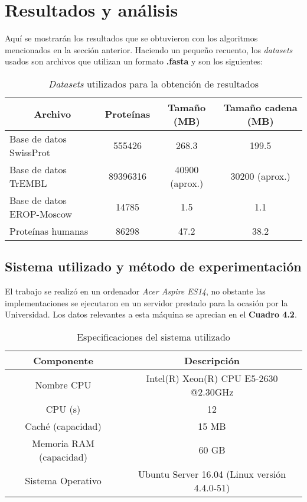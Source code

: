 \chapter{Resultados y análisis}

Aquí se mostrarán los resultados que se obtuvieron con los algoritmos mencionados en la sección anterior. Haciendo un pequeño recuento, los \textit{datasets} usados son archivos que utilizan un formato \textbf{.fasta} y son los siguientes:

\begin{table}[h]
\centering
\label{my-labelr1}
\begin{tabular}{|l|c|c|c|}
\hline
\multicolumn{1}{|c|}{\textbf{Archivo}} & \textbf{Proteínas} & \textbf{Tamaño (MB)} & \textbf{Tamaño cadena (MB)} \\ \hline
Base de datos SwissProt    & 555426                & 268.3                & 199.5              \\
Base de datos TrEMBL        & 89396316              & 40900 (aprox.)       & 30200 (aprox.)     \\
Base de datos EROP-Moscow        & 14785                 & 1.5                  & 1.1                \\
Proteínas humanas     & 86298                 & 47.2                 & 38.2               \\ \hline
\end{tabular}
\caption{\textit{Datasets} utilizados para la obtención de resultados}
\end{table} 

\section{Sistema utilizado y método de experimentación}

El trabajo se realizó en un ordenador \textit{Acer Aspire ES14}, no obstante las implementaciones se ejecutaron en un servidor prestado para la ocasión por la Universidad. Los datos relevantes a esta máquina se aprecian en el \textbf{Cuadro 4.2}.

\begin{table}[h]
\centering
\label{my-labelr2}
\begin{tabular}{|c|c|}
\hline
\textbf{Componente}     & \textbf{Descripción}                         \\ \hline
Nombre CPU              & Intel(R) Xeon(R) CPU E5-2630 @2.30GHz        \\
CPU (s)                 & 12                                           \\
Caché (capacidad)       & 15 MB                                        \\
Memoria RAM (capacidad) & 60 GB                                        \\
Sistema Operativo       & Ubuntu Server 16.04 (Linux versión 4.4.0-51) \\ \hline
\end{tabular}
\caption{Especificaciones del sistema utilizado}
\end{table}

